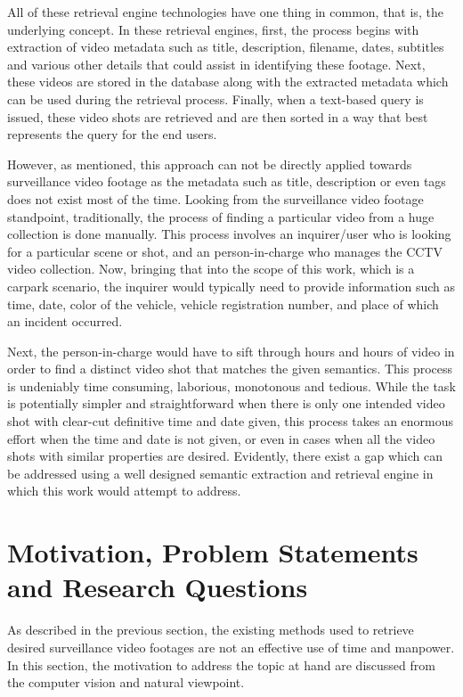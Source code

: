 All of these retrieval engine technologies have one thing in common, that is, the underlying concept. In these retrieval engines, first, the process begins with extraction of video metadata such as title, description, filename, dates, subtitles and various other details that could assist in identifying these footage. Next, these videos are stored in the database along with the extracted metadata which can be used during the retrieval process. Finally, when a text-based query is issued, these video shots are retrieved and are then sorted in a way that best represents the query for the end users. 

However, as mentioned, this approach can not be directly applied towards surveillance video footage as the metadata such as title, description or even tags does not exist most of the time. Looking from the surveillance video footage standpoint, traditionally, the process of finding a particular video from a huge collection is done manually. This process involves an inquirer/user who is looking for a particular scene or shot, and an person-in-charge who manages the CCTV video collection. Now, bringing that into the scope of this work, which is a carpark scenario, the inquirer would typically need to provide information such as time, date, color of the vehicle, vehicle registration number, and place of which an incident occurred. %

Next, the person-in-charge would have to sift through hours and hours of video in order to find a distinct video shot that matches the given semantics. This process is undeniably time consuming, laborious, monotonous and tedious. While the task is potentially simpler and straightforward when there is only one intended video shot with clear-cut definitive time and date given, this process takes an enormous effort when the time and date is not given, or even in cases when all the video shots with similar properties are desired. Evidently, there exist a gap which can be addressed using a well designed semantic extraction and retrieval engine in which this work would attempt to address.

\section{Motivation, Problem Statements and Research Questions}

As described in the previous section, the existing methods used to retrieve desired surveillance video footages are not an effective use of time and manpower. In this section, the motivation to address the topic at hand are discussed from the computer vision and natural viewpoint.

